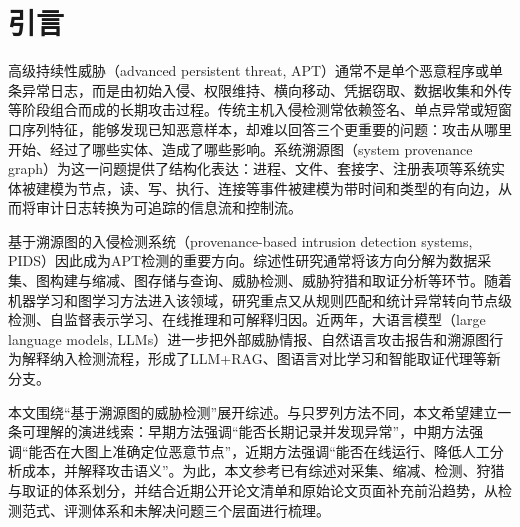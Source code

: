 \chapter{引言}

高级持续性威胁（advanced persistent threat, APT）通常不是单个恶意程序或单条异常日志，而是由初始入侵、权限维持、横向移动、凭据窃取、数据收集和外传等阶段组合而成的长期攻击过程。传统主机入侵检测常依赖签名、单点异常或短窗口序列特征，能够发现已知恶意样本，却难以回答三个更重要的问题：攻击从哪里开始、经过了哪些实体、造成了哪些影响。系统溯源图（system provenance graph）为这一问题提供了结构化表达：进程、文件、套接字、注册表项等系统实体被建模为节点，读、写、执行、连接等事件被建模为带时间和类型的有向边，从而将审计日志转换为可追踪的信息流和控制流。

基于溯源图的入侵检测系统（provenance-based intrusion detection systems, PIDS）因此成为APT检测的重要方向。综述性研究通常将该方向分解为数据采集、图构建与缩减、图存储与查询、威胁检测、威胁狩猎和取证分析等环节\citep{zipperle2023survey,leng2022review}。随着机器学习和图学习方法进入该领域，研究重点又从规则匹配和统计异常转向节点级检测、自监督表示学习、在线推理和可解释归因\citep{li2025intelligent}。近两年，大语言模型（large language models, LLMs）进一步把外部威胁情报、自然语言攻击报告和溯源图行为解释纳入检测流程，形成了LLM+RAG、图语言对比学习和智能取证代理等新分支\citep{omniseq2025,provseek2025,aptcglp2025}。

本文围绕“基于溯源图的威胁检测”展开综述。与只罗列方法不同，本文希望建立一条可理解的演进线索：早期方法强调“能否长期记录并发现异常”，中期方法强调“能否在大图上准确定位恶意节点”，近期方法强调“能否在线运行、降低人工分析成本，并解释攻击语义”。为此，本文参考已有综述对采集、缩减、检测、狩猎与取证的体系划分\citep{zipperle2023survey,leng2022review,li2025intelligent}，并结合近期公开论文清单和原始论文页面补充前沿趋势\citep{xythink2026papers}，从检测范式、评测体系和未解决问题三个层面进行梳理。

